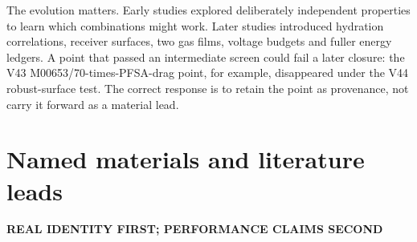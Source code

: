 \documentclass[10pt,a4paper]{article}
\newcommand{\eyebrow}[1]{{\sffamily\bfseries\small\color{Teal}\MakeUppercase{#1}}}
\begin{document}
The evolution matters. Early studies explored deliberately independent
properties to learn which combinations might work. Later studies introduced
hydration correlations, receiver surfaces, two gas films, voltage budgets and
fuller energy ledgers. A point that passed an intermediate screen could fail a
later closure: the V43 M00653/70-times-PFSA-drag point, for example,
disappeared under the V44 robust-surface test. The correct response is to
retain the point as provenance, not carry it forward as a material lead.

\section{Named materials and literature leads}
\eyebrow{Real identity first; performance claims second}
\end{document}
